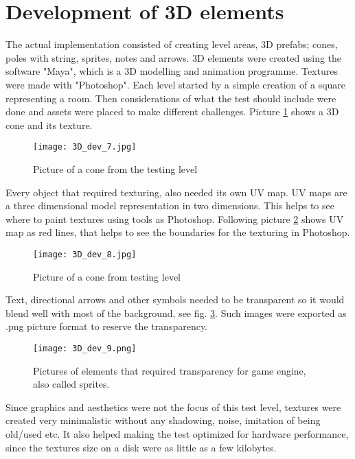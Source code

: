 \section{Development of 3D elements}
The actual implementation consisted of creating level areas, 3D prefabs; cones, poles with string, sprites, notes and arrows. 3D elements were created using the software "Maya", which is a 3D modelling and animation programme. Textures were made with "Photoshop". Each level started by a simple creation of a square representing a room. Then considerations of what the test should include were done and assets were placed to make different challenges. Picture \ref{3dDevelopment1} shows a 3D cone and its texture.
\begin{figure}[H]
\centering
\texttt{[image: 3D\_dev\_7.jpg]}
\caption{Picture of a cone from the testing level}
\label {3dDevelopment1}
\end{figure}
Every object that required texturing, also needed its own UV map. UV maps are a three dimensional model representation in two dimensions. This helps to see where to paint textures using tools as Photoshop. Following picture \ref{3dDevelopment2} shows UV map as red lines, that helps to see the boundaries for the texturing in Photoshop.
\begin{figure}[H]
\centering
\texttt{[image: 3D\_dev\_8.jpg]}
\caption{Picture of a cone from testing level}
\label {3dDevelopment2}
\end{figure}
Text, directional arrows and other symbols needed to be transparent so it would blend well with most of the background, see fig. \ref {3dDevelopment3}. Such images were exported as .png picture format to reserve the transparency. 

\begin{figure}[H]
\centering
\texttt{[image: 3D\_dev\_9.png]}
\caption{Pictures of elements that required transparency for game engine, also called sprites.}
\label {3dDevelopment3}
\end{figure}

Since graphics and aesthetics were not the focus of this test level, textures were created very minimalistic without any shadowing, noise, imitation of being old/used etc. It also helped making the test optimized for hardware performance, since the textures size on a disk were as little as a few kilobytes.

